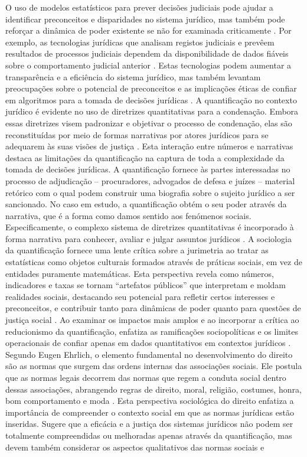 \begin{agradecimentos}
    O uso de modelos estatísticos para prever decisões judiciais pode ajudar a identificar preconceitos e disparidades no sistema jurídico, mas também pode reforçar a dinâmica de poder existente se não for examinada criticamente \cite{ 101017s0003975609000150}. Por exemplo, as tecnologias jurídicas que analisam registos judiciais e prevêem resultados de processos judiciais dependem da disponibilidade de dados fiáveis sobre o comportamento judicial anterior \cite{ribeiro2021quantification}. Estas tecnologias podem aumentar a transparência e a eficiência do sistema jurídico, mas também levantam preocupações sobre o potencial de preconceitos e as implicações éticas de confiar em algoritmos para a tomada de decisões jurídicas \cite{silva2023role}. A quantificação no contexto jurídico é evidente no uso de diretrizes quantitativas para a condenação. Embora essas diretrizes visem padronizar e objetivar o processo de condenação, elas são reconstituídas por meio de formas narrativas por atores jurídicos para se adequarem às suas visões de justiça \cite{101111lsi12334}. Esta interação entre números e narrativas destaca as limitações da quantificação na captura de toda a complexidade da tomada de decisões jurídicas. A quantificação fornece às partes interessadas no processo de adjudicação – procuradores, advogados de defesa e juízes – material retórico com o qual podem construir uma biografia sobre o sujeito jurídico a ser sancionado. No caso em estudo, a quantificação obtém o seu poder através da narrativa, que é a forma como damos sentido aos fenómenos sociais. Especificamente, o complexo sistema de diretrizes quantitativas é incorporado à forma narrativa para conhecer, avaliar e julgar assuntos jurídicos \cite{101111lsi12334}. A sociologia da quantificação fornece uma lente crítica sobre a jurimetria ao tratar as estatísticas como objetos culturais formados através de práticas sociais, em vez de entidades puramente matemáticas. Esta perspectiva revela como números, indicadores e taxas se tornam “artefatos públicos” que interpretam e moldam realidades sociais, destacando seu potencial para refletir certos interesses e preconceitos, e contribuir tanto para dinâmicas de poder quanto para questões de justiça social \cite{camargo2021,paiva2021}. Ao examinar os impactos mais amplos e ao incorporar a crítica ao reducionismo da quantificação, enfatiza as ramificações sociopolíticas e os limites operacionais de confiar apenas em dados quantitativos em contextos jurídicos \cite{sousa2024,saltelli2020}. Segundo Eugen Ehrlich, o elemento fundamental no desenvolvimento do direito são as normas que surgem das ordens internas das associações sociais. Ele postula que as normas legais decorrem das normas que regem a conduta social dentro dessas associações, abrangendo regras de direito, moral, religião, costumes, honra, bom comportamento e moda \cite{venturini2024, venturini2024p24-25, venturini2024p22-23, venturini2024p18}. Esta perspectiva sociológica do direito enfatiza a importância de compreender o contexto social em que as normas jurídicas estão inseridas. Sugere que a eficácia e a justiça dos sistemas jurídicos não podem ser totalmente compreendidas ou melhoradas apenas através da quantificação, mas devem também considerar os aspectos qualitativos das normas sociais e 
\end{agradecimentos}
